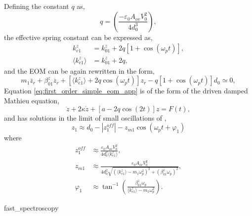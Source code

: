 \documentclass[12pt, a4paper, oneside]{book}
\begin{document}
Defining the constant $q$ as,
\begin{equation} q = \left(\frac{-\varepsilon_0 A_{ov} V_0^2}{4d_0^3}\right), \end{equation}
the effective spring constant can be expressed as,
\begin{align}
k_{e1}^z &= k_{01}^z + 2q \left[1+\cos(\omega_pt)\right],\\
\langle k_{e1}^{z} \rangle &= k_{01}^z + 2q,
\end{align}
and the EOM can be again rewritten in the form,
\begin{equation}
m_1\ddot{z_r} + \beta_{01}^z\dot{z_r} + \left[\langle k_{e1}^z\rangle + 2q\cos(\omega_pt)\right]z_r - q\left[1+\cos(\omega_pt)\right]d_0 \simeq 0,
\label{eq:first_order_simple_eom_app}
\end{equation}
Equation \eqref{eq:first_order_simple_eom_app} is of the form of the driven damped Mathieu equation,
\begin{equation} \ddot{z} + 2\kappa\dot{z} + [a - 2q\cos(2t)]z = F(t), \end{equation}
and has solutions in the limit of small oscillations of \cite{savage2012thesis},
\begin{equation}
z_1 \approx d_0 - \left|z_{1}^{off}\right| - z_{m1}\cos(\omega_pt+\varphi_1)
\label{eq:tip_oscillation_app}
\end{equation}
where
\begin{subequations}
\begin{align}
z_1^{off} &\approx %
\frac{ \varepsilon_0 A_{ov} V_0^2 }{ 4d_0^2 \langle k_{e1}^z \rangle }, \label{eq:tip_amp_app}\\
%
z_{m1} &\approx %
\frac{ \varepsilon_0 A_{ov} V_0^2 }%
{ 4d_0^2 \sqrt{ (\langle k_{e1}^z \rangle - m_1\omega_p^2)^2 + (\beta_{01}^z\omega_p)^2  } }, \\
%
\varphi_1 &\approx \tan^{-1}\left(\frac{\beta_{01}^{z}\omega_{p}}{\langle k_{e1}^{z} \rangle -m_{1}\omega_{p}^{2}}\right). \label{eq:tip_phase_app}
\end{align}
\end{subequations}

{fast_spectroscopy}

\begin{singlespace}
\printbibliography[category=appendices, resetnumbers=true, title={Supplementary Bibliography}]
\end{singlespace}
\end{document}
